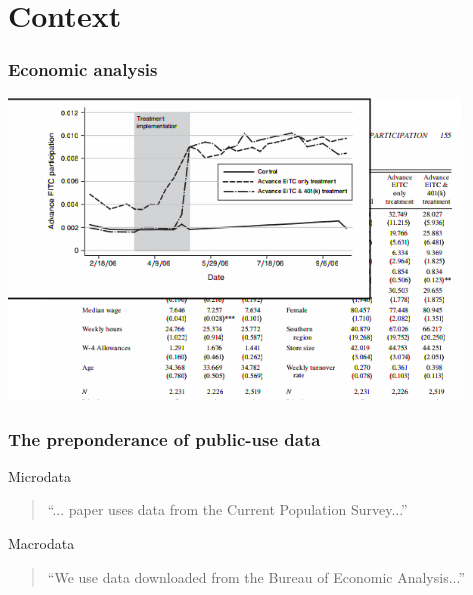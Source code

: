 \section{Context}


\begin{frame}
\frametitle{Economic analysis}
	\centering
\includegraphics[width=0.9\textwidth]{Selection_119.png}
\end{frame}


\begin{frame}
\frametitle{The preponderance of public-use data}
\begin{block}{Microdata}
\begin{quote}
	``... paper uses data from the Current Population Survey...''
\end{quote}
\end{block}

\pause
\begin{block}{Macrodata}
	\begin{quote}
		``We use data downloaded from the Bureau of Economic Analysis...''
	\end{quote}
\end{block}

\end{frame}


